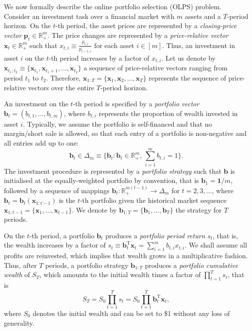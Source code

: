 We now formally describe the online portfolio selection (OLPS) problem. Consider an investment task over a financial market with $m$ assets and a $T$-period horizon. On the $t$-th period, the asset prices are represented by a \emph{closing-price vector} $\mathbf{p}_t \in \mathbb{R}^m_+$. The price changes are represented by a \emph{price-relative vector} $\mathbf{x}_t \in \mathbb{R}_+^m$ such that $x_{t,i} \equiv \frac{p_{t,i}}{p_{t-1,i}}$ for each asset $i \in [m]$. Thus, an investment in asset $i$ on the $t$-th period increases by a factor of $x_{t,i}$. Let us denote by $\mathbf{x}_{t_1:t_2} \equiv \{\mathbf{x}_{t_1}, \mathbf{x}_{t_1+1}, \ldots, \mathbf{x}_{t_2}\}$ a sequence of price-relative vectors ranging from period $t_1$ to $t_2$. Therefore, $\mathbf{x}_{1:T} = \{\mathbf{x}_{1}, \mathbf{x}_{2}, \ldots, \mathbf{x}_{T}\}$ represents the sequence of price-relative vectors over the entire $T$-period horizon.

An investment on the $t$-th period is specified by a \emph{portfolio vector} $\mathbf{b}_t = (b_{t,1}, \ldots, b_{t,m})$, where $b_{t,i}$ represents the proportion of wealth invested in asset $i$. Typically, we assume the portfolio is self-financed and that no margin/short sale is allowed, so that each entry of a portfolio is non-negative and all entries add up to one:
\begin{equation}
	\mathbf{b}_t \in \Delta_m
	\equiv \Big\{\mathbf{b}_t : \mathbf{b}_t \in \mathbb{R}^m_+,\, \sum_{i =1}^m b_{t,i} = 1\Big\}.
\end{equation}
The investment procedure is represented by a \emph{portfolio strategy} such that $\mathbf{b}$ is initialised at the equally-weighted portfolio by convention, that is $\mathbf{b}_1 = \mathbf{1}/m$, followed by a sequence of mappings $\mathbf{b}_t : \mathbb{R}^{m(t-1)}_{+} \rightarrow \Delta_m$ for $t = 2, 3, \ldots$, where $\mathbf{b}_t = \mathbf{b}_t(\mathbf{x}_{1:t-1})$ is the $t$-th portfolio given the historical market sequence $\mathbf{x}_{1:t-1} = \{\mathbf{x}_1, \ldots, \mathbf{x}_{t-1}\}$. We denote by $\mathbf{b}_{1:T} = \{\mathbf{b}_1, \ldots, \mathbf{b}_T\}$ the strategy for $T$ periods.

On the $t$-th period, a portfolio $\mathbf{b}_t$ produces a \emph{portfolio period return} $s_t$, that is, the wealth increases by a factor of $s_t \equiv \mathbf{b}_t^\text{T}\mathbf{x}_t = \sum_{i=1}^m b_{t,i}x_{t,i}$. We shall assume all profits are reinvested, which implies that wealth grows in a multiplicative fashion. Thus, after $T$ periods, a portfolio strategy $\mathbf{b}_{1:T}$ produces a \emph{portfolio cumulative wealth} of $S_T$, which amounts to the initial wealth times a factor of $\prod_{t=1}^T s_t$, that is
\begin{equation}
\label{eq:portfolio-cumulative-wealth}
	S_T
	= S_0\prod_{t=1}^T s_t
	= S_0\prod_{t=1}^T \mathbf{b}_t^\text{T}\mathbf{x}_t,
\end{equation}
where $S_0$ denotes the initial wealth and can be set to \$1 without any loss of generality.

